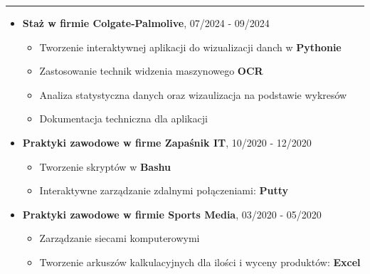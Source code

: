 \documentclass[10pt]{article}
\newcommand{\longline}{\rule{19.6cm}{1pt}}
\begin{document}
\noindent \longline 
\begin{itemize}[leftmargin=*]
    \item \textbf{Staż w firmie Colgate-Palmolive}, 07/2024 - 09/2024
    \begin{itemize}
        \item Tworzenie interaktywnej aplikacji do wizualizacji danch w \textbf{Pythonie}
        \item Zastosowanie technik widzenia maszynowego \textbf{OCR} 
        \item Analiza statystyczna danych oraz wizaulizacja na podstawie wykresów
        \item Dokumentacja techniczna dla aplikacji
    \end{itemize}
    \item \textbf{Praktyki zawodowe w firme Zapaśnik IT}, 10/2020 - 12/2020
    \begin{itemize}
        \item Tworzenie skryptów w \textbf{Bashu} 
        \item Interaktywne zarządzanie zdalnymi połączeniami: \textbf{Putty}
    \end{itemize}
    \item \textbf{Praktyki zawodowe w firmie Sports Media}, 03/2020 - 05/2020
    \begin{itemize}
        \item Zarządzanie siecami komputerowymi
        \item Tworzenie arkuszów kalkulacyjnych dla ilości i wyceny produktów: \textbf{Excel}
    \end{itemize}
\end{itemize}
\end{document}
